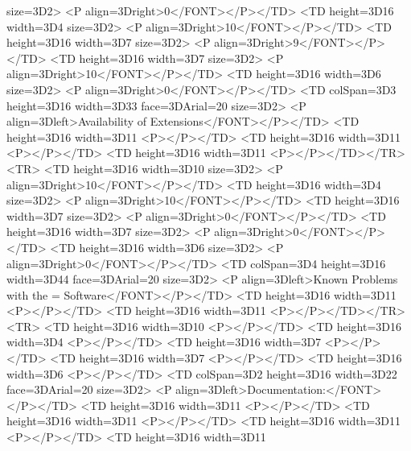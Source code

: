 size=3D2>
            <P align=3Dright>0</FONT></P></TD>
        <TD height=3D16 width=3D4%
size=3D2>
            <P align=3Dright>10</FONT></P></TD>
        <TD height=3D16 width=3D7%
size=3D2>
            <P align=3Dright>9</FONT></P></TD>
        <TD height=3D16 width=3D7%
size=3D2>
            <P align=3Dright>10</FONT></P></TD>
        <TD height=3D16 width=3D6%
size=3D2>
            <P align=3Dright>0</FONT></P></TD>
        <TD colSpan=3D3 height=3D16 width=3D33%
face=3DArial=20
            size=3D2>
            <P align=3Dleft>Availability of Extensions</FONT></P></TD>
        <TD height=3D16 width=3D11%
            <P></P></TD>
        <TD height=3D16 width=3D11%
            <P></P></TD>
        <TD height=3D16 width=3D11%
            <P></P></TD></TR>
    <TR>
        <TD height=3D16 width=3D10%
size=3D2>
            <P align=3Dright>10</FONT></P></TD>
        <TD height=3D16 width=3D4%
size=3D2>
            <P align=3Dright>10</FONT></P></TD>
        <TD height=3D16 width=3D7%
size=3D2>
            <P align=3Dright>0</FONT></P></TD>
        <TD height=3D16 width=3D7%
size=3D2>
            <P align=3Dright>0</FONT></P></TD>
        <TD height=3D16 width=3D6%
size=3D2>
            <P align=3Dright>0</FONT></P></TD>
        <TD colSpan=3D4 height=3D16 width=3D44%
face=3DArial=20
            size=3D2>
            <P align=3Dleft>Known Problems with the =
Software</FONT></P></TD>
        <TD height=3D16 width=3D11%
            <P></P></TD>
        <TD height=3D16 width=3D11%
            <P></P></TD></TR>
    <TR>
        <TD height=3D16 width=3D10%
            <P></P></TD>
        <TD height=3D16 width=3D4%
            <P></P></TD>
        <TD height=3D16 width=3D7%
            <P></P></TD>
        <TD height=3D16 width=3D7%
            <P></P></TD>
        <TD height=3D16 width=3D6%
            <P></P></TD>
        <TD colSpan=3D2 height=3D16 width=3D22%
face=3DArial=20
            size=3D2>
            <P align=3Dleft>Documentation:</FONT></P></TD>
        <TD height=3D16 width=3D11%
            <P></P></TD>
        <TD height=3D16 width=3D11%
            <P></P></TD>
        <TD height=3D16 width=3D11%
            <P></P></TD>
        <TD height=3D16 width=3D11%
